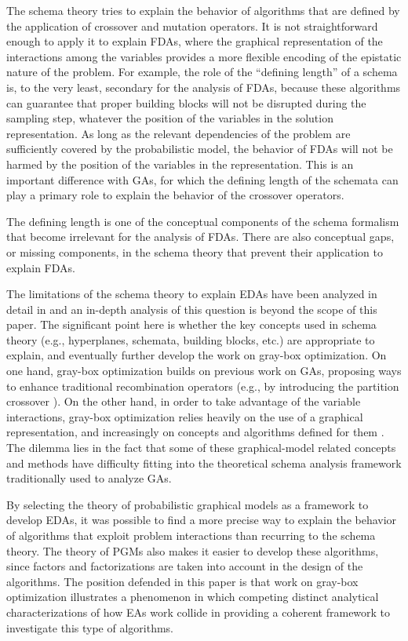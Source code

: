 \documentclass{article} %
\begin{document}
The schema theory tries to explain the behavior of algorithms that are defined by the application of crossover and mutation operators. It is not straightforward enough to apply it to explain FDAs, where the graphical representation of the interactions among the variables provides a more flexible encoding of the epistatic nature of the problem. For example, the role of the ``defining length'' of a schema is, to the very least, secondary for the analysis of FDAs, because these algorithms can guarantee that proper  building blocks will not be disrupted during the sampling step,  whatever the position of the variables in the solution representation. As long as the relevant dependencies of the problem are sufficiently covered by the probabilistic model, the behavior of FDAs will not be harmed by the position of the variables in the representation. This is an important difference with GAs, for which the defining length of the schemata can play a primary role to explain the behavior of the crossover operators. 

The defining length is  one of the conceptual components of the schema formalism that become irrelevant for the analysis of FDAs. There are also conceptual gaps, or missing components, in the schema theory that prevent their application to explain FDAs. 

 The limitations of the schema theory to explain EDAs have been analyzed in detail in \cite{Santana_et_al:2007f} and an in-depth analysis of this question is beyond the scope of this paper. The significant point here is whether the key concepts used in schema theory (e.g., hyperplanes, schemata, building blocks, etc.)  are appropriate to explain, and eventually further develop the work on  gray-box optimization. On one hand, gray-box optimization builds on previous work on GAs, proposing ways to enhance traditional recombination operators (e.g., by introducing the partition crossover \cite{Tinos_et_al:2015}). On the other hand, in order to take advantage  of the variable interactions, gray-box optimization relies heavily on the use of a graphical representation, and increasingly on concepts and algorithms defined for them \cite{Whitley_et_al:2016}. The dilemma lies in the fact that some of these graphical-model related concepts and methods have difficulty fitting into the theoretical schema analysis framework traditionally used to analyze GAs.

 By selecting the theory of probabilistic graphical models as a framework to develop EDAs, it was possible to find a more precise  way to explain the behavior of algorithms that exploit problem interactions than recurring to the schema theory. The theory of PGMs also makes it easier to develop these algorithms, since factors and factorizations are taken into account in the design of the algorithms. The position defended in this paper is that work on gray-box optimization illustrates a phenomenon in which competing distinct analytical characterizations of how EAs work collide
 in providing a coherent framework to investigate this type of algorithms.
 
\end{document}
